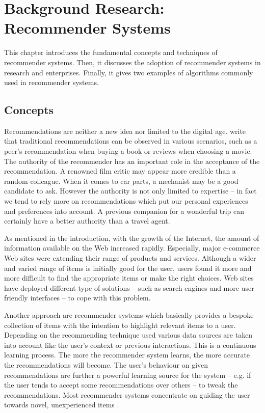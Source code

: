 \chapter{Background Research: Recommender Systems}

This chapter introduces the fundamental concepts and techniques of recommender systems. Then, it discusses the adoption of recommender systems in research and enterprises. Finally, it gives two examples of algorithms commonly used in recommender systems.

\section{Concepts}

Recommendations are neither a new idea nor limited to the digital age. \citet{ricci11} write that traditional recommendations can be observed in various scenarios, such as a peer's recommendation when buying a book or reviews when choosing a movie. The authority of the recommender has an important role in the acceptance of the recommendation. A renowned film critic may appear more credible than a random colleague. When it comes to car parts, a mechanist may be a good candidate to ask. However the authority is not only limited to expertise -- in fact we tend to rely more on recommendations which put our personal experiences and preferences into account. A previous companion for a wonderful trip can certainly have a better authority than a travel agent.

As mentioned in the introduction, with the growth of the Internet, the amount of information available on the Web increased rapidly. Especially, major e-commerce Web sites were extending their range of products and services. Although a wider and varied range of items is initially good for the user, users found it more and more difficult to find the appropriate items or make the right choices. Web sites have deployed different type of solutions -- such as search engines and more user friendly interfaces -- to cope with this problem.

Another approach are recommender systems which basically provides a bespoke collection of items with the intention to highlight relevant items to a user. Depending on the recommending technique used various data sources are taken into account like the user's context or previous interactions. This is a continuous learning process. The more the recommender system learns, the more accurate the recommendations will become. The user's behaviour on given recommendations are further a powerful learning source for the system -- e.g. if the user tends to accept some recommendations over others -- to tweak the recommendations. Most recommender systems concentrate on guiding the user towards novel, unexperienced items \cite{herlocker04}.



